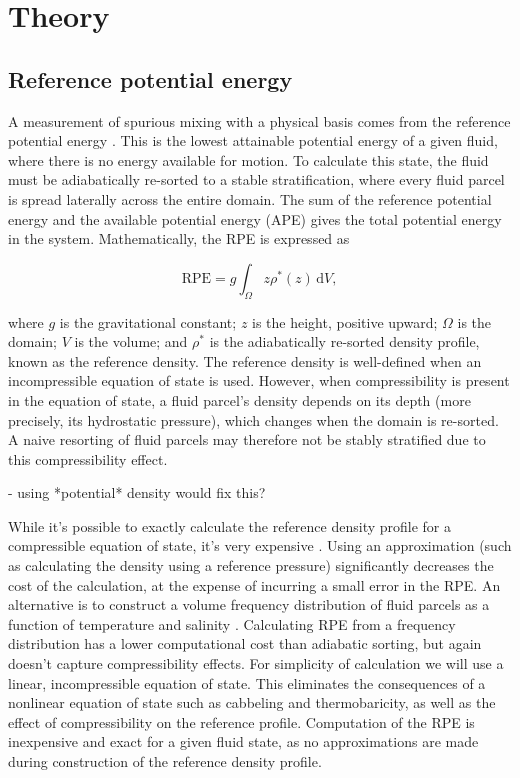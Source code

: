 \section{Theory}
\subsection{Reference potential energy}
A measurement of spurious mixing with a physical basis comes from the reference potential energy \citep[known also as background potential energy][]{winters95}. This is the lowest attainable potential energy of a given fluid, where there is no energy available for motion. To calculate this state, the fluid must be adiabatically re-sorted to a stable stratification, where every fluid parcel is spread laterally across the entire domain. The sum of the reference potential energy and the available potential energy (APE) gives the total potential energy in the system. Mathematically, the RPE is expressed as

\begin{equation}
  \mathrm{RPE} = g \int_\Omega z \rho^*(z)\,\mathrm dV,
\end{equation}

where $g$ is the gravitational constant; $z$ is the height, positive upward; $\Omega$ is the domain; $V$ is the volume; and $\rho^*$ is the adiabatically re-sorted density profile, known as the reference density. The reference density is well-defined when an incompressible equation of state is used. However, when compressibility is present in the equation of state, a fluid parcel's density depends on its depth (more precisely, its hydrostatic pressure), which changes when the domain is re-sorted. A naive resorting of fluid parcels may therefore not be stably stratified due to this compressibility effect.

- using *potential* density would fix this?

While it's possible to exactly calculate the reference density profile for a compressible equation of state, it's very expensive \citep{ilicak12}. Using an approximation (such as calculating the density using a reference pressure) significantly decreases the cost of the calculation, at the expense of incurring a small error in the RPE. An alternative is to construct a volume frequency distribution of fluid parcels as a function of temperature and salinity \citep{saenz15}. Calculating RPE from a frequency distribution has a lower computational cost than adiabatic sorting, but again doesn't capture compressibility effects. For simplicity of calculation we will use a linear, incompressible equation of state. This eliminates the consequences of a nonlinear equation of state such as cabbeling and thermobaricity, as well as the effect of compressibility on the reference profile. Computation of the RPE is inexpensive and exact for a given fluid state, as no approximations are made during construction of the reference density profile.

